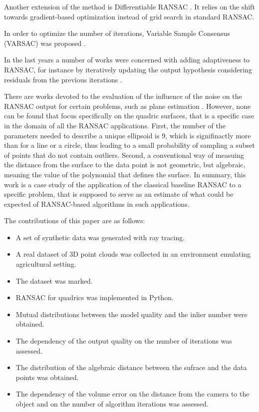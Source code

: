 Another extension of the method is Differentiable RANSAC \cite{wei2023generalized}.
It relies on the shift towards gradient-based optimization instead of grid search in standard RANSAC.

In order to optimize the number of iterations, Variable Sample Consensus (VARSAC) was proposed \cite{yu2009outlier}.

In the last years a number of works were concerned with adding adaptiveness to RANSAC, for instance by iteratively updating the output hypothesis considering residuals from the previous iterations \cite{cavalli2023consensus}.

There are works devoted to the evaluation of the influence of the noise on the RANSAC output for certain problems, such as plane estimation \cite{Lee20201PointRM}.
However, none can be found that focus specifically on the quadric surfaces, that is a specific case in the domain of all the RANSAC applications.
First, the number of the parameters needed to describe a unique ellipsoid is 9, which is signifinactly more than for a line or a circle, thus leading to a small probability of sampling a subset of points that do not contain outliers.
Second, a conventional way of measuing the distance from the surface to the data point is not geometric, but algebraic, meaning the value of the polynomial that defines the surface.
In summary, this work is a case study of the application of the classical baseline RANSAC to a specific problem, that is supposed to serve as an estimate of what could be expected of RANSAC-based algorithms in such applications.

The contributions of this paper are as follows:

\begin{itemize}
  \item A set of synthetic data was generated with ray tracing.
  \item A real dataset of 3D point clouds was collected in an environment emulating agricultural setting.
  \item The dataset was marked.
  \item RANSAC for quadrics was implemented in Python.
  \item Mutual distributions between the model quality and the inlier number were obtained.
  \item The dependency of the output quality on the number of iterations was assessed.
  \item The distribution of the algebraic distance between the sufrace and the data points was obtained.
  \item The dependency of the volume error on the distance from the camera to the object and on the number of algorithm iterations was assessed.
\end{itemize}

